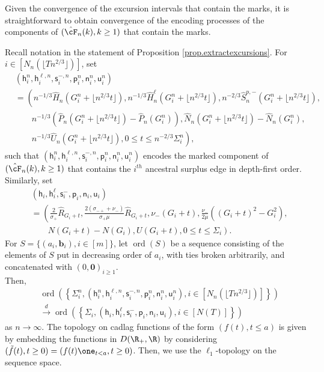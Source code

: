 Given the convergence of the excursion intervals that contain the marks, it is straightforward to obtain convergence of the encoding processes of the components of $(\hat{\cF}_n(k), k\geq 1)$ that contain the marks. 
\begin{corollary}\label{cor.convergencesequenceofcomponents}
Recall notation in the statement of Proposition \ref{prop.extractexcursions}. For $i\in \left[N_n\left(\lfloor T n^{2/3}\rfloor\right)\right]$, set
\begin{align*}
    &\left(\mathsf{h}_i^n,\mathsf{h}_i^{\ell,n}, \mathsf{s}_i^{-,n}, \mathsf{p}^n_i, \mathsf{n}_i^n, \mathsf{u}_i^n\right)\\
    &=\left(n^{-1/3}\hat{H}_n\left(G_i^n+\lfloor n^{2/3} t \rfloor\right),n^{-1/3}\hat{H}^{\ell}_n\left(G_i^n+\lfloor n^{2/3} t \rfloor\right),  n^{-2/3}\hat{S}^{p,-}_n\left(G_i^n+\lfloor n^{2/3} t \rfloor\right),\right.\\
     &\qquad n^{-1/3}\left(\hat{P}_n\left(G_i^n+\lfloor n^{2/3} t \rfloor\right)-\hat{P}_n\left(G_i^n\right)\right), \hat{N}_n\left(G_i^n+\lfloor n^{2/3} t \rfloor\right)-\hat{N}_n\left(G_i^n\right), \\
     &\qquad \left.n^{-1/3}\hat{U}_n\left(G_i^n+\lfloor n^{2/3} t \rfloor\right), 0\leq t \leq n^{-2/3}\Sigma_i^n\right),
\end{align*}
such that $\left(\mathsf{h}_i^n,\mathsf{h}_i^{\ell,n}, \mathsf{s}_i^{-,n}, \mathsf{p}^n_i, \mathsf{n}_i^n, \mathsf{u}_i^n\right)$ encodes the marked component of $(\hat{\cF}_n(k), k\geq 1)$ that contains the $i^{th}$ ancestral surplus edge in depth-first order. 
Similarly, set
\begin{align*}
    &\left(\mathsf{h}_i,\mathsf{h}_i^{\ell}, \mathsf{s}_i^{-}, \mathsf{p}_i, \mathsf{n}_i, \mathsf{u}_i\right)\\
    &=\left(\frac{2}{\sigma_+}\hat{R}_{G_i+t},\frac{2(\sigma_{-+}+\nu_-)}{\sigma_+\mu}\hat{R}_{G_i+t},  \nu_-(G_i+t),\frac{\nu_-}{2\mu}\left((G_i+t)^2-G_i^2\right),\right.\\
    &\qquad\left.N(G_i+t)-N(G_i), U(G_i+t), 0\leq t \leq \Sigma_i\right).
\end{align*}
For $S=\{(a_i,\mathbf{b}_i), i\in [m]\}$, let $\operatorname{ord}(S)$ be a sequence consisting of the elements of $S$ put in decreasing order of $a_i$, with ties broken arbitrarily, and concatenated with $(0,\mathbf{0})_{i\geq 1}$.\\
Then, 
\begin{align*}&\operatorname{ord}\left(\left\{\Sigma_i^n, \left(\mathsf{h}_i^n,\mathsf{h}_i^{\ell,n}, \mathsf{s}_i^{-,n}, \mathsf{p}^n_i, \mathsf{n}_i^n, \mathsf{u}_i^n\right), i\in \left[N_n\left(\lfloor T n^{2/3}\rfloor\right)\right]\right\}\right)\\
&\overset{d}{\to}\operatorname{ord}\left(\left\{\Sigma_i, \left(\mathsf{h}_i,\mathsf{h}_i^{\ell}, \mathsf{s}_i^{-}, \mathsf{p}_i, \mathsf{n}_i, \mathsf{u}_i\right), i\in \left[N(T)\right]\right\}\right)\end{align*}
as $n\to \infty$. The topology on cadlag functions of the form $(f(t),t\leq a)$ is given by embedding the functions in $D(\R_+,\R)$ by considering $(\tilde{f}(t),t\geq 0)=(f(t)\one_{t<a}, t\geq 0)$. Then, we use the $\ell_1$-topology on the sequence space.
\end{corollary}
